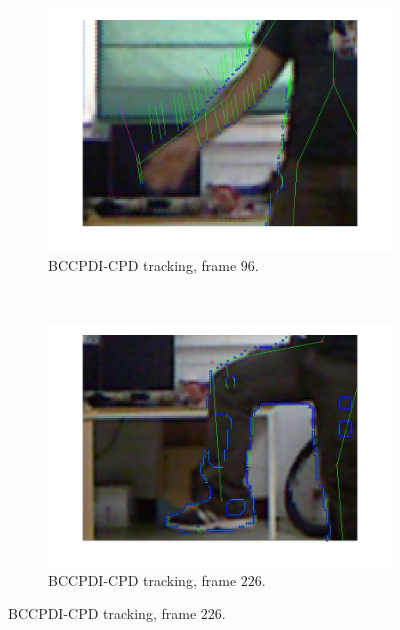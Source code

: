 \begin{figure}[t]
        \begin{subfigure}[b]{0.45\textwidth}
                \centering
                \includegraphics[width=\textwidth, trim=0 0 0 0,clip]{fig30.jpg}
                \caption{BCCPDI-CPD tracking, frame $96$.}
                \label{fig:cp02_comparison_oflow_fails_elbow_cpd_side}
        \end{subfigure}%
	~
        \begin{subfigure}[b]{0.45\textwidth}
                \centering
                \includegraphics[width=\textwidth, trim=0 0 0 0,clip]{fig31.jpg}
                \caption{BCCPDI-CPD tracking, frame $226$.}
                \label{fig:cp02_comparison_oflow_fails_knee_cpd_side}
        \end{subfigure}%


\end{figure}
